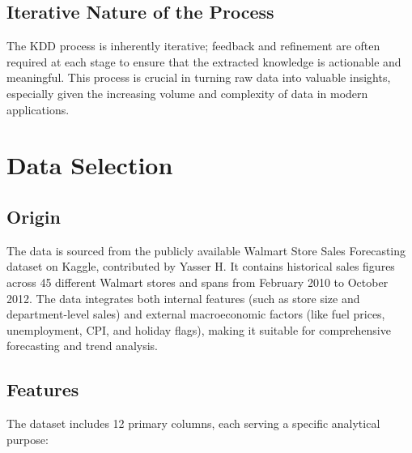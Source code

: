 \subsection{Iterative Nature of the Process}

The KDD process is inherently iterative; feedback and refinement are often required at each stage to ensure that the extracted knowledge is actionable and meaningful. This process is crucial in turning raw data into valuable insights, especially given the increasing volume and complexity of data in modern applications. \cite{Maimon:2005}


\section{Data Selection}

\subsection{Origin}

The data is sourced from the publicly available Walmart Store Sales Forecasting dataset on Kaggle, contributed by Yasser H. It contains historical sales figures across 45 different Walmart stores and spans from February 2010 to October 2012. The data integrates both internal features (such as store size and department-level sales) and external macroeconomic factors (like fuel prices, unemployment, CPI, and holiday flags), making it suitable for comprehensive forecasting and trend analysis.
\cite{Yasserh:WalmartDataset}


\subsection{Features}

The dataset includes 12 primary columns, each serving a specific analytical purpose:

